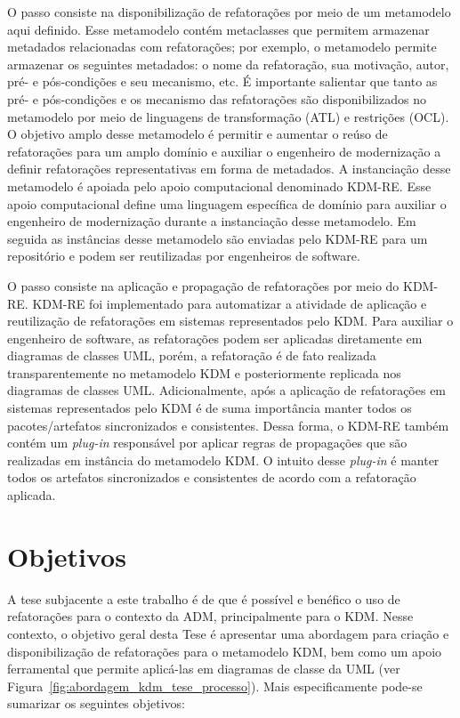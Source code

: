 O passo  consiste na disponibilização de refatorações por meio de um metamodelo aqui definido. Esse metamodelo contém metaclasses que permitem armazenar metadados relacionadas com refatorações; por exemplo, o metamodelo permite armazenar os seguintes metadados: o nome da refatoração, sua motivação, autor, pré- e pós-condições e seu mecanismo, etc. É importante salientar que tanto as pré- e pós-condições e os mecanismo das refatorações são disponibilizados no metamodelo por meio de linguagens de transformação (ATL) e restrições (OCL). O objetivo amplo desse metamodelo é permitir e aumentar o reúso de refatorações para um amplo domínio e auxiliar o engenheiro de modernização a definir refatorações representativas em forma de metadados. A instanciação desse metamodelo é apoiada pelo apoio computacional denominado KDM-RE. Esse apoio computacional define uma linguagem específica de domínio para auxiliar o engenheiro de modernização durante a instanciação desse metamodelo. Em seguida as instâncias desse metamodelo são enviadas pelo KDM-RE para um repositório e podem ser reutilizadas por engenheiros de software. 

O passo  consiste na aplicação e propagação de refatorações por meio do KDM-RE. KDM-RE foi implementado para automatizar a atividade de aplicação e reutilização de refatorações em sistemas representados pelo KDM. Para auxiliar o engenheiro de software, as refatorações podem ser aplicadas diretamente em diagramas de classes UML, porém, a refatoração é de fato realizada transparentemente no metamodelo KDM e posteriormente replicada nos diagramas de classes UML. Adicionalmente, após a aplicação de refatorações em sistemas representados pelo KDM é de suma importância manter todos os pacotes/artefatos sincronizados e consistentes. Dessa forma, o KDM-RE também contém um \textit{plug-in} responsável por aplicar regras de propagações que são realizadas em instância do metamodelo KDM. O intuito desse \textit{plug-in} é manter todos os artefatos sincronizados e consistentes de acordo com a refatoração aplicada.


\section{Objetivos}\label{sec:objetivos}

A tese subjacente a este trabalho é de que é possível e benéfico o uso de refatorações para o contexto da ADM, principalmente para o KDM. Nesse contexto, o objetivo geral desta Tese é apresentar uma abordagem para criação e disponibilização de refatorações para o metamodelo KDM, bem como um apoio ferramental que permite aplicá-las em diagramas de classe da UML (ver Figura~\ref{fig:abordagem_kdm_tese_processo}). Mais especificamente pode-se sumarizar os seguintes objetivos:%

